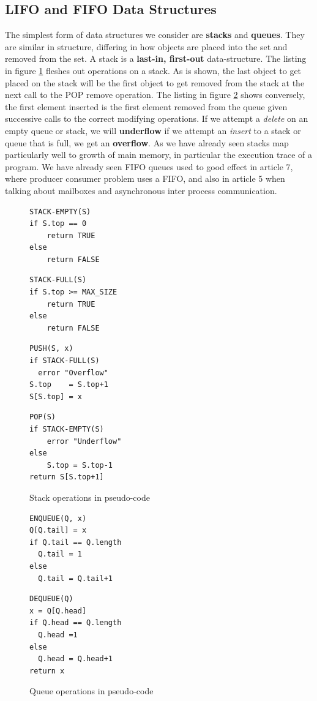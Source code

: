 \documentclass[10pt,a4paper]{article}
\begin{document}
\subsection{LIFO and FIFO Data Structures}
The simplest form of data structures we consider are {\bf stacks} and {\bf queues}. They are similar in structure, differing in how objects are placed into the set and removed from the set. A stack is a {\bf last-in, first-out} data-structure. The listing in figure \ref{stack} fleshes out operations on a stack. As is shown, the last object to get placed on the stack will be the first object to get removed from the stack at the next call to the POP remove operation. The listing in figure \ref{queue} shows conversely, the first element inserted is the first element removed from the queue given successive calls to the correct modifying operations. If we attempt a {\it delete} on an empty queue or stack, we will {\bf underflow} if we attempt an {\it insert} to a stack or queue that is full, we get an {\bf overflow}. As we have already seen stacks map particularly well to growth of main memory, in particular the execution trace of a program. We have already seen FIFO queues used to good effect in article 7, where producer consumer problem uses a FIFO, and also in article 5 when talking about mailboxes and asynchronous inter process communication. 
\begin{figure}
\caption{Stack operations in pseudo-code}
\begin{center}
\begin{lstlisting}
STACK-EMPTY(S)
if S.top == 0
    return TRUE
else  
    return FALSE
\end{lstlisting}
\begin{lstlisting}
STACK-FULL(S)
if S.top >= MAX_SIZE
    return TRUE
else  
    return FALSE
\end{lstlisting}
\begin{lstlisting}
PUSH(S, x)
if STACK-FULL(S)
  error "Overflow"
S.top    = S.top+1
S[S.top] = x	
\end{lstlisting}
\begin{lstlisting}
POP(S)
if STACK-EMPTY(S)
    error "Underflow"
else  
    S.top = S.top-1
return S[S.top+1]
\end{lstlisting}
\label{stack}
\end{center}
\end{figure}
\begin{figure}
\caption{Queue operations in pseudo-code}
\begin{center}
\begin{lstlisting}
ENQUEUE(Q, x)
Q[Q.tail] = x
if Q.tail == Q.length
  Q.tail = 1
else
  Q.tail = Q.tail+1
\end{lstlisting}
\begin{lstlisting}
DEQUEUE(Q)
x = Q[Q.head]
if Q.head == Q.length
  Q.head =1
else
  Q.head = Q.head+1
return x
\end{lstlisting}
\label{queue}
\end{center}
\end{figure}
\end{document}

